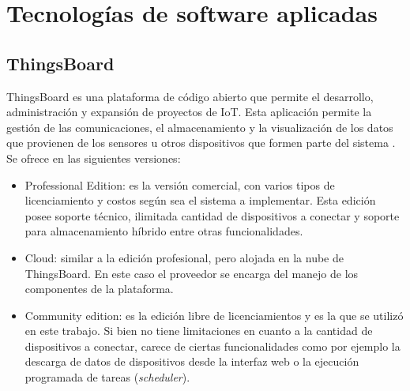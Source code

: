 \pagebreak
\section{Tecnologías de software aplicadas}
\label{sec:Software aplicado}
\subsection{ThingsBoard}
\label{sec:ThingsBoard}
ThingsBoard es una plataforma de código abierto que permite el desarrollo, administración y expansión de proyectos de IoT. Esta aplicación permite la gestión de las comunicaciones, el almacenamiento y la visualización de los datos que provienen de los sensores u otros dispositivos que formen parte del sistema \citep{thingsboard:1}.
Se ofrece en las siguientes versiones:
\begin{itemize}

\item Professional Edition: es la versión comercial, con varios tipos de licenciamiento y costos según sea el sistema a implementar. Esta edición posee soporte técnico, ilimitada cantidad de dispositivos a conectar y soporte para almacenamiento híbrido entre otras funcionalidades.

\item Cloud: similar a la edición profesional, pero alojada en la nube de ThingsBoard. En este caso el proveedor se encarga del manejo de los componentes de la plataforma.
 
\item Community edition: es la edición libre de licenciamientos y es la que se utilizó en este trabajo. Si bien no tiene limitaciones en cuanto a la cantidad de dispositivos a conectar, carece de ciertas funcionalidades como por ejemplo la descarga de datos de dispositivos desde la interfaz web o la ejecución programada de tareas (\textit{scheduler}).
\end{itemize}
%
%
%
